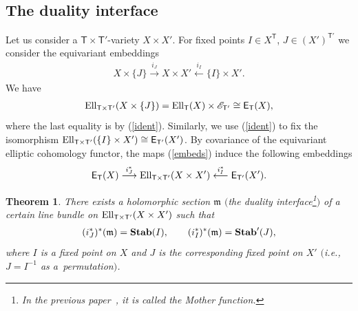 \documentclass[10pt,a4paper]{amsart}
\newcommand{\bT}{\mathsf{T}}
\newcommand{\cE}{\mathscr{E}}
\numberwithin{equation}{section}
\newtheorem{Theorem}{Theorem}[section]
\begin{document}
\subsection{The duality interface}
Let us consider a $\bT\times \bT'$-variety $X\times X'$. For fixed points $I\in X^{\bT}$, $J\in (X')^{\bT'}$ we consider the equivariant embeddings
\begin{gather} \label{embeds}
X\times \{ J \} \stackrel{i_{J}}{\longrightarrow} X\times X' \stackrel{i_{I}}{\longleftarrow} \{I\}\times X' .
\end{gather}
We have
\begin{gather*}
{\rm Ell}_{\bT\times\bT'}(X\times \{ J \})={\rm Ell}_{\bT}(X)\times \cE_{\bT'}\cong \mathsf{E}_{\bT}(X),
\end{gather*}
where the last equality is by (\ref{ident}). Similarly, we use (\ref{ident})
to fix the isomorphism ${\rm Ell}_{\bT\times\bT'}(\{I\}\times X')\cong\mathsf{E}_{\bT'}(X')$. By covariance of the equivariant elliptic cohomology functor, the maps (\ref{embeds}) induce the following embeddings
\begin{gather*}
\mathsf{E}_{\bT}(X) \stackrel{i^{*}_{J}}{\longrightarrow} {\rm Ell}_{\bT\times\bT' }(X\times X' )\stackrel{i^{*}_{I}}{\longleftarrow} \mathsf{E}_{\bT'}(X').
\end{gather*}


\begin{Theorem} There exists a holomorphic section ${\mathfrak{m}}$ $($the \emph{duality interface}\footnote{In the previous paper~\cite{RVSZ}, it is called the \emph{Mother function}.}$)$ of a certain line bundle on ${\rm Ell}_{\bT\times\bT' }(X\times X' )$ such that
 \begin{gather*}
 (i^{*}_{J})^*({\mathfrak{m}})= {\bf Stab}(I), \qquad (i^{*}_{I})^*({\mathfrak{m}})= {\bf Stab}' (J),
 \end{gather*}
 where $I$ is a fixed point on $X$ and $J$ is the corresponding fixed point on $X'$ $($i.e., $J=I^{-1}$ as a~permutation$)$.
\end{Theorem}
\end{document}
